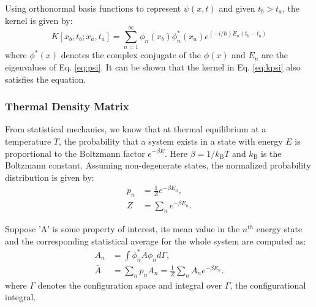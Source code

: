            Using orthonormal basis functions to represent $\psi(x,t)$ and given $t_b > t_a$, the kernel is given by:
            \begin{equation}
                \label{eq:kpsi}
                K[x_b,t_b;x_a,t_a] = \displaystyle\sum\limits_{n = 1}^\infty \phi_n(x_b){\phi^*_n(x_a)} e^{(-i/\hbar)E_n(t_b - t_a)}
            \end{equation}
            where $\phi^*(x)$ denotes the complex conjugate of the $\phi(x)$ and $E_n$ are the eigenvalues of Eq. \eqref{eq:psi}. It can be shown that the kernel in Eq. \eqref{eq:kpsi} also satisfies the \Schrodinger{} equation.

        \subsubsection{Thermal Density Matrix}
            From statistical mechanics, we know that at thermal equilibrium at a temperature $T$, the probability that a system exists in a state with energy $E$ is proportional to the Boltzmann factor $e^{-\beta E}$. Here $\beta = 1/k_\text{B} T$ and $k_\text{B}$ is the Boltzmann constant. Assuming non-degenerate states, the normalized probability distribution is given by:
            \begin{equation}
                \begin{aligned}
                    p_n &= \frac{1}{Z}e^{-\beta E_n}, \\
                    Z &= \displaystyle\sum\limits_n e^{-\beta E_n}.
                \end{aligned}
            \end{equation}

            Suppose 'A' is some property of interest, its mean value in the $n^{th}$ energy state and the corresponding statistical average for the whole system are computed as:
            \begin{equation}
                \begin{aligned}
                    A_n &= \displaystyle\int \phi_n^* A \phi_n d\Gamma,\\
                    \bar{A} &= \displaystyle\sum\limits_n p_n A_n = \frac{1}{Z} \displaystyle\sum\limits_n A_n e^{-\beta E_n}.
                \end{aligned}
            \end{equation}
            where $\Gamma$ denotes the configuration space and integral over $\Gamma$, the configurational integral.

